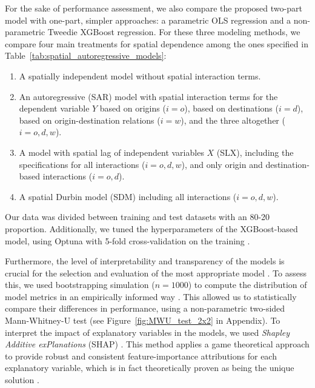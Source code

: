 For the sake of performance assessment, we also compare the proposed two-part model with one-part, simpler approaches: a parametric OLS regression and a non-parametric Tweedie XGBoost regression. For these three modeling methods, we compare four main treatments for spatial dependence among the ones specified in Table~\ref{tab:spatial_autoregressive_models}: 
\begin{enumerate}
    \item A spatially independent model without spatial interaction terms.
    \item An autoregressive (SAR) model with spatial interaction terms for the dependent variable $Y$ based on origins ($i=o$), based on destinations ($i=d$), based on origin-destination relations ($i=w$), and the three altogether ($i=o,d,w$).
    \item A model with spatial lag of independent variables $X$ (SLX), including the specifications for all interactions ($i=o,d,w$), and only origin and destination-based interactions ($i=o,d$). 
    \item A spatial Durbin model (SDM) including all interactions ($i=o,d,w$).
\end{enumerate}
Our data was divided between training and test datasets with an 80-20 proportion. Additionally, we tuned the hyperparameters of the XGBoost-based model, using Optuna with 5-fold cross-validation on the training \citep{Akiba2019Optuna:Framework, Krasniqi2022ParametricFrequency}. 

Furthermore, the level of interpretability and transparency of the models is crucial for the selection and evaluation of the most appropriate model \citep{Huang2023IncreasingExplanations}. To assess this, we used bootstrapping simulation ($n=1000$) to compute the distribution of model metrics in an empirically informed way \citep{DiCiccio1996BootstrapIntervals}. This allowed us to statistically compare their differences in performance, using a non-parametric two-sided Mann-Whitney-U test \citep{Mann1947} (see Figure~\ref{fig:MWU_test_2x2} in Appendix). To interpret the impact of explanatory variables in the models, we used \emph{Shapley Additive exPlanations} (SHAP) \citep{Lundberg2017APredictions}. This method applies a game theoretical approach \citep{Strumbelj2014ExplainingContributions} to provide robust and consistent feature-importance attributions for each explanatory variable, which is in fact theoretically proven as being the unique solution \citep{Fujimoto2006AxiomaticIndices}.


